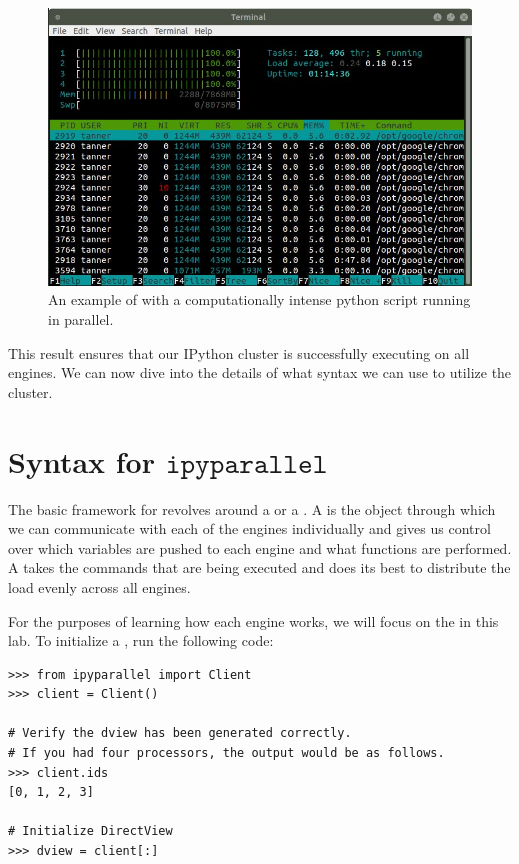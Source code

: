 \begin{figure}[H]
    \includegraphics[width=\textwidth]{cluster_active.jpg}
\caption{An example of  with a computationally intense python script running in parallel.}
\label{fig:htop_cluster}
\end{figure}

This result ensures that our IPython cluster is successfully executing on all engines.
We can now dive into the details of what syntax we can use to utilize the cluster.

\section*{Syntax for $\texttt{ipyparallel}$}
The basic framework for  revolves around a  or a .
A  is the object through which we can communicate with each of the engines individually and gives us control over which variables are pushed to each engine and what functions are performed. 
A  takes the commands that are being executed and does its best to distribute the load evenly across all engines.

For the purposes of learning how each engine works, we will focus on the  in this lab. 
To initialize a , run the following code:

\begin{lstlisting}
>>> from ipyparallel import Client
>>> client = Client()

# Verify the dview has been generated correctly.
# If you had four processors, the output would be as follows.
>>> client.ids
[0, 1, 2, 3]

# Initialize DirectView
>>> dview = client[:]
\end{lstlisting}

